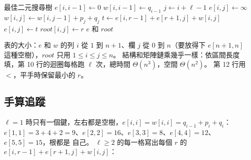 \begin{pseudo}[label=alg:dp-obst]{最佳二元搜尋樹}
        \State $e[i, i - 1] \gets 0$
        \State $w[i, i - 1] \gets q_{i-1}$
    \EndFor
     
            \State $j \gets i + \ell - 1$
            \State $e[i, j] \gets \infty$
            \State $w[i, j] \gets w[i, j - 1] + p_j + q_j$
                \State $t \gets e[i, r - 1] + e[r + 1, j] + w[i, j]$
                    \State $e[i, j] \gets t$
                    \State $\mathit{root}[i, j] \gets r$
                \EndIf
            \EndFor
        \EndFor
    \EndFor
    \State \Return $e$ 和 $\mathit{root}$
\EndFunction
\end{pseudo}

表的大小：$e$ 和 $w$ 的列 $i$ 從 $1$ 到 $n + 1$、欄 $j$ 從 $0$ 到 $n$（要放得下 $e[n+1, n]$
這種空樹），$\mathit{root}$ 只用 $1 \le i \le j \le n$。 結構和矩陣鏈乘幾乎一樣：依區間長度
填，第 10 行的迴圈每格跑 $\ell$ 次，總時間 $\Theta(n^3)$，空間 $\Theta(n^2)$。 第 12 行用
$<$，平手時保留最小的 $r$。

\subsection{手算追蹤}
\label{sec:dp-obst-trace}

$\ell = 1$ 時只有一個鍵，左右都是空樹，$e[i, i] = w[i, i] = q_{i-1} + p_i + q_i$：
$e[1,1] = 3 + 4 + 2 = 9$、$e[2,2] = 16$、$e[3,3] = 8$、$e[4,4] = 12$、$e[5,5] = 15$，根都是
自己。 $\ell \ge 2$ 的每一格寫出每個 $r$ 的 $e[i, r-1] + e[r+1, j] + w[i, j]$：

